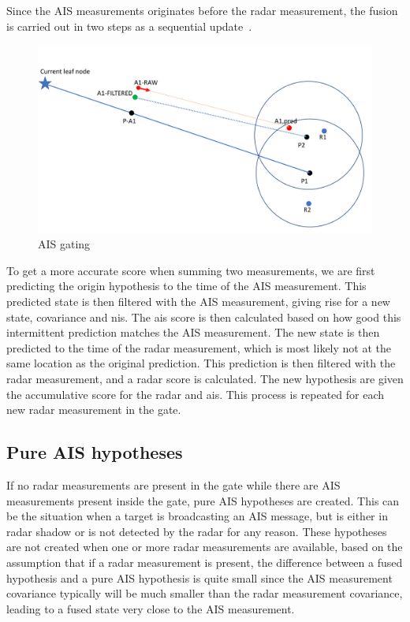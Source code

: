 Since the AIS measurements originates before the radar measurement, the fusion is carried out in two steps as a sequential update~\cite{Bar-Shalom1995}. 
\begin{figure}[H]
\centering
\includegraphics[width = .8\textwidth]{Figures/AIS_gating.pdf}
\caption{AIS gating}\label{fig:ais_gating}
\end{figure}
To get a more accurate score when summing two measurements, we are first predicting the origin hypothesis to the time of the AIS measurement. This predicted state is then filtered with the AIS measurement, giving rise for a new state, covariance and \gls{nis}. The \gls{ais} score is then calculated based on how good this intermittent prediction matches the AIS measurement. The new state is then predicted to the time of the radar measurement, which is most likely not at the same location as the original prediction. This prediction is then filtered with the radar measurement, and a radar score is calculated. The new hypothesis are given the accumulative score for the radar and \gls{ais}. This process is repeated for each new radar measurement in the gate.

\subsection{Pure AIS hypotheses}\label{subsec:pure_ais_hypotheses}
If no radar measurements are present in the gate while there are AIS measurements present inside the gate, pure AIS hypotheses are created. This can be the situation when a target is broadcasting an AIS message, but is either in radar shadow or is not detected by the radar for any reason. These hypotheses are not created when one or more radar measurements are available, based on the assumption that if a radar measurement is present, the difference between a fused hypothesis and a pure AIS hypothesis is quite small since the AIS measurement covariance typically will be much smaller than the radar measurement covariance, leading to a fused state very close to the AIS measurement.

